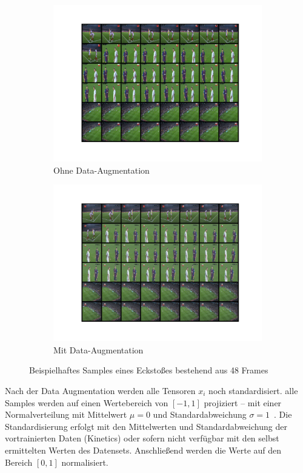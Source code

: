 \begin{figure}
    \centering
    \begin{subfigure}[b]{.49\textwidth}
        \centering
        \includegraphics[width=.95\linewidth, trim=0 80 0 80, clip]{img/05_sample_orig.png}
        \caption{Ohne Data-Augmentation}
    \end{subfigure}%
    \begin{subfigure}[b]{.49\textwidth}
        \centering
        \includegraphics[width=.95\linewidth, trim=0 80 0 80, clip]{img/05_sample_aug4.png}
        \caption{Mit Data-Augmentation}
    \end{subfigure}
    \caption{Beispielhaftes Samples eines Eckstoßes bestehend aus 48 Frames}
    \label{fig:sample_example}
\end{figure}

Nach der Data Augmentation werden alle Tensoren $x_i$ noch standardisiert.
\Dh alle Samples werden auf einen Wertebereich von $\left[ -1, 1\right]$ projiziert -- mit einer Normalverteilung mit Mittelwert $\mu = 0$ und Standardabweichung $\sigma = 1$~\cite{Burkov19}.
Die Standardisierung erfolgt mit den Mittelwerten und Standardabweichung der vortrainierten Daten (\zB Kinetics) oder sofern nicht verfügbar mit den selbst ermittelten Werten des Datensets.
Anschließend werden die Werte auf den Bereich $\left[0, 1\right]$ normalisiert.
